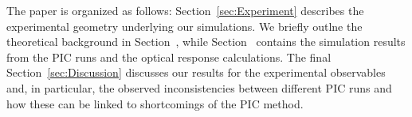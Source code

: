 \documentclass[preprint, 12pt]{elsarticle}
\begin{document}
The paper is organized as follows:
Section~\ref{sec:Experiment} describes the experimental geometry underlying our
simulations. We briefly outlne the theoretical background in
Section~\label{sec:Theory}, while
Section~\label{sec:Results} contains the simulation results
from the PIC runs and the optical response calculations. The final
Section~\ref{sec:Discussion} discusses our results for the experimental
observables and, in particular,
the observed inconsistencies between different PIC runs and how these can be
linked to shortcomings of the PIC method.

%
\end{document}

